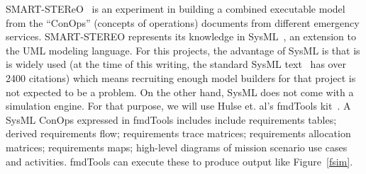 \documentclass[twoside]{NSF}
\begin{document}
\begin{nsfdescription}
SMART-STEReO~\cite{hardy22}  is an experiment in building a combined 
executable model from  the  ``ConOps'' (concepts of  operations) documents
from  different  
     emergency services.
 SMART-STEREO
  represents its knowledge in    SysML~\cite{friedenthal2014practical},   an extension to the UML modeling language.
For this  projects, the  advantage of SysML is that is is widely used
(at the time of this writing, the standard SysML text~\cite{friedenthal2014practical} has over 2400 citations)
which means recruiting enough model builders for that project
is not expected to be a problem. On the other hand, SysML does
not come with a simulation engine.
For that purpose,   we will use Hulse et. al's  fmdTools kit~\cite{hulse2021fmdtools}.
A SysML  ConOps expressed
in fmdTools includes
include
requirements tables;
derived requirements flow; requirements trace matrices; requirements allocation matrices; requirements maps; high-level diagrams of mission scenario use
cases and activities. fmdTools can execute these to   produce output
like Figure~\ref{fsim}.










\end{nsfdescription}
\end{document}
